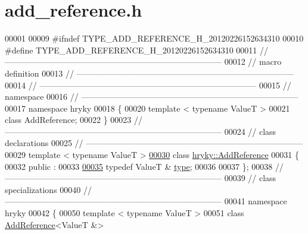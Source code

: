 \hypertarget{add__reference_8h_source}{\section{add\-\_\-reference.\-h}
}

\begin{DoxyCode}
00001 
00009 \textcolor{preprocessor}{#ifndef TYPE\_ADD\_REFERENCE\_H\_20120226152634310}
00010 \textcolor{preprocessor}{}\textcolor{preprocessor}{#define TYPE\_ADD\_REFERENCE\_H\_20120226152634310}
00011 \textcolor{preprocessor}{}\textcolor{comment}{//
      ------------------------------------------------------------------------------}
00012 \textcolor{comment}{// macro definition}
00013 \textcolor{comment}{//
      ------------------------------------------------------------------------------}
00014 \textcolor{comment}{//
      ------------------------------------------------------------------------------}
00015 \textcolor{comment}{// namespace}
00016 \textcolor{comment}{//
      ------------------------------------------------------------------------------}
00017 \textcolor{keyword}{namespace }hryky
00018 \{
00020     \textcolor{keyword}{template} < \textcolor{keyword}{typename} ValueT >
00021     \textcolor{keyword}{class }AddReference;
00022 \}
00023 \textcolor{comment}{//
      ------------------------------------------------------------------------------}
00024 \textcolor{comment}{// class declarations}
00025 \textcolor{comment}{//
      ------------------------------------------------------------------------------}
00029 \textcolor{comment}{}\textcolor{keyword}{template} < \textcolor{keyword}{typename} ValueT >
\hypertarget{add__reference_8h_source_l00030}{}\hyperlink{classhryky_1_1_add_reference}{00030} \textcolor{keyword}{class }\hyperlink{classhryky_1_1_add_reference}{hryky::AddReference}
00031 \{
00032 \textcolor{keyword}{public} :
00033 
\hypertarget{add__reference_8h_source_l00035}{}\hyperlink{classhryky_1_1_add_reference_a4b90c1381625432ba6152b7388bc4399}{00035}     \textcolor{keyword}{typedef} ValueT &       \hyperlink{classhryky_1_1_add_reference_a4b90c1381625432ba6152b7388bc4399}{type};
00036 
00037 \};
00038 \textcolor{comment}{//
      ------------------------------------------------------------------------------}
00039 \textcolor{comment}{// class specializations}
00040 \textcolor{comment}{//
      ------------------------------------------------------------------------------}
00041 \textcolor{keyword}{namespace }hryky
00042 \{
00050 \textcolor{keyword}{template} < \textcolor{keyword}{typename} ValueT >
00051 \textcolor{keyword}{class }\hyperlink{classhryky_1_1_add_reference}{AddReference}<ValueT &>

\end{DoxyCode}
